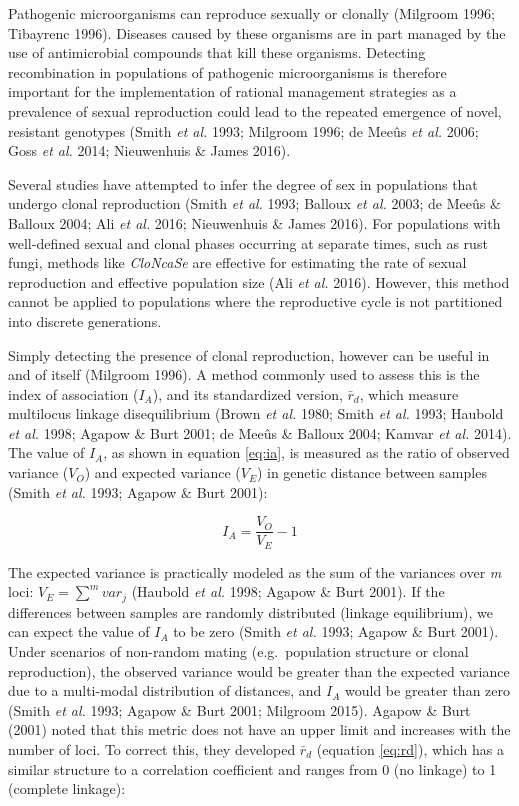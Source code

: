 \documentclass[]{article}
\theoremstyle{definition}
\theoremstyle{definition}
\theoremstyle{remark}
\begin{document}
Pathogenic microorganisms can reproduce sexually or clonally (Milgroom
1996; Tibayrenc 1996). Diseases caused by these organisms are in part
managed by the use of antimicrobial compounds that kill these organisms.
Detecting recombination in populations of pathogenic microorganisms is
therefore important for the implementation of rational management
strategies as a prevalence of sexual reproduction could lead to the
repeated emergence of novel, resistant genotypes (Smith \emph{et al.}
1993; Milgroom 1996; de Meeûs \emph{et al.} 2006; Goss \emph{et al.}
2014; Nieuwenhuis \& James 2016).

Several studies have attempted to infer the degree of sex in populations
that undergo clonal reproduction (Smith \emph{et al.} 1993; Balloux
\emph{et al.} 2003; de Meeûs \& Balloux 2004; Ali \emph{et al.} 2016;
Nieuwenhuis \& James 2016). For populations with well-defined sexual and
clonal phases occurring at separate times, such as rust fungi, methods
like \emph{CloNcaSe} are effective for estimating the rate of sexual
reproduction and effective population size (Ali \emph{et al.} 2016).
However, this method cannot be applied to populations where the
reproductive cycle is not partitioned into discrete generations.

Simply detecting the presence of clonal reproduction, however can be
useful in and of itself (Milgroom 1996). A method commonly used to
assess this is the index of association (\(I_A\)), and its standardized
version, \(\bar{r}_d\), which measure multilocus linkage disequilibrium
(Brown \emph{et al.} 1980; Smith \emph{et al.} 1993; Haubold \emph{et
al.} 1998; Agapow \& Burt 2001; de Meeûs \& Balloux 2004; Kamvar
\emph{et al.} 2014). The value of \(I_A\), as shown in equation
\eqref{eq:ia}, is measured as the ratio of observed variance (\(V_O\)) and
expected variance (\(V_E\)) in genetic distance between samples (Smith
\emph{et al.} 1993; Agapow \& Burt 2001):

\begin{equation}
I_A = \frac{V_O}{V_E} - 1 \label{eq:ia}
\end{equation}

The expected variance is practically modeled as the sum of the variances
over \emph{m} loci: \(V_E = \sum^m{var_j}\) (Haubold \emph{et al.} 1998;
Agapow \& Burt 2001). If the differences between samples are randomly
distributed (linkage equilibrium), we can expect the value of \(I_A\) to
be zero (Smith \emph{et al.} 1993; Agapow \& Burt 2001). Under scenarios
of non-random mating (e.g.~population structure or clonal reproduction),
the observed variance would be greater than the expected variance due to
a multi-modal distribution of distances, and \(I_A\) would be greater
than zero (Smith \emph{et al.} 1993; Agapow \& Burt 2001; Milgroom
2015). Agapow \& Burt (2001) noted that this metric does not have an
upper limit and increases with the number of loci. To correct this, they
developed \(\bar{r}_d\) (equation \eqref{eq:rd}), which has a similar
structure to a correlation coefficient and ranges from 0 (no linkage) to
1 (complete linkage):
\end{document}
